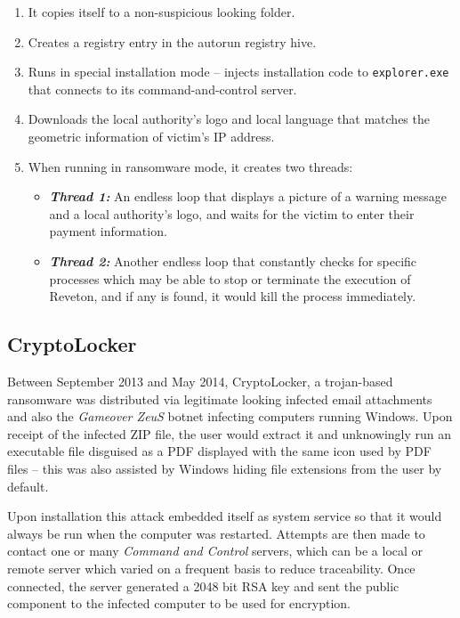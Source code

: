\documentclass[10pt,a4paper]{article}
\begin{document}
\begin{enumerate}
\setlength\itemsep{-0.5em}
\item It copies itself to a non-suspicious looking folder.
\item Creates a registry entry in the autorun registry hive.
\item Runs in special installation mode -- injects installation code to \texttt{explorer.exe} that connects to its command-and-control server.
\item Downloads the local authority’s logo and local language that matches the geometric information of victim’s IP address.
\item When running in ransomware mode, it creates two threads:
\begin{itemize}
\item \textbf{\textit{Thread 1: }}An endless loop that displays a picture of a warning message and a local authority’s logo, and waits for the victim to enter their payment information.
\item \textbf{\textit{Thread 2: }}Another endless loop that constantly checks for specific processes which may be able to stop or terminate the execution of Reveton, and if any is found, it would kill the process immediately.
\end{itemize}
\end{enumerate}

\subsection{CryptoLocker}
Between September 2013 and May 2014, CryptoLocker, a trojan-based ransomware was distributed via legitimate looking infected email attachments and also the \textit{Gameover ZeuS} botnet infecting computers running Windows. Upon receipt of the infected ZIP file, the user would extract it and unknowingly run an executable file disguised as a PDF displayed with the same icon used by PDF files -- this was also assisted by Windows hiding file extensions from the user by default.

Upon installation this attack embedded itself as system service so that it would always be run when the computer was restarted. Attempts are then made to contact one or many \textit{Command and Control} servers, which can be a local or remote server which varied on a frequent basis to reduce traceability. Once connected, the server generated a 2048 bit RSA key and sent the public component to the infected computer to be used for encryption.
\end{document}

